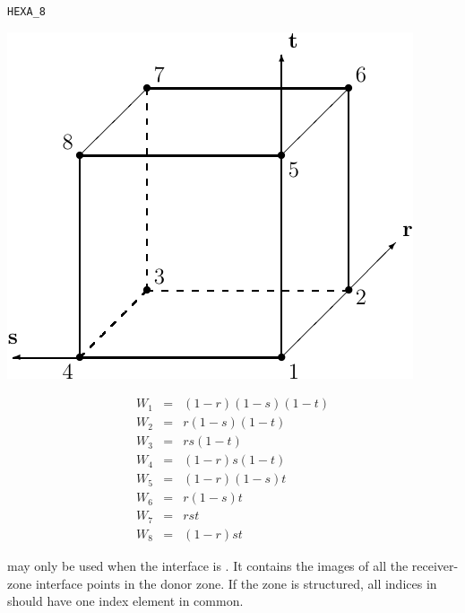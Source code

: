 \newpage
\texttt{HEXA\_8}\\[-2\baselineskip]
\begin{center}
\begin{minipage}[t]{0.5\linewidth}
   \centering
   \vspace{0pt}
   \includegraphics{cnct.figs/cnct_unst_hexa8}
\end{minipage}%
\begin{minipage}[t]{0.5\linewidth}
   \vspace{-\abovedisplayskip}
   \begin{eqnarray*}
      W_1 &=& (1-r)(1-s)(1-t) \\
      W_2 &=& r(1-s)(1-t) \\
      W_3 &=& rs(1-t) \\
      W_4 &=& (1-r)s(1-t) \\
      W_5 &=& (1-r)(1-s)t \\
      W_6 &=& r(1-s)t \\
      W_7 &=& rst \\
      W_8 &=& (1-r)st
   \end{eqnarray*}
\end{minipage}
\end{center}

 may only be used when the interface is
.
It contains the images of all the receiver-zone interface points in the
donor zone.
If the zone is structured, all indices in 
should have one index element in common.

